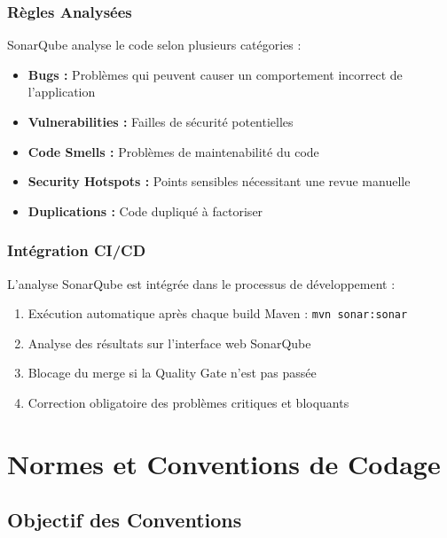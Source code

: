 \documentclass[12pt,a4paper]{report}
\begin{document}
\subsection{Règles Analysées}

SonarQube analyse le code selon plusieurs catégories :

\begin{itemize}
    \item \textbf{Bugs :} Problèmes qui peuvent causer un comportement incorrect de l'application
    \item \textbf{Vulnerabilities :} Failles de sécurité potentielles
    \item \textbf{Code Smells :} Problèmes de maintenabilité du code
    \item \textbf{Security Hotspots :} Points sensibles nécessitant une revue manuelle
    \item \textbf{Duplications :} Code dupliqué à factoriser
\end{itemize}

\subsection{Intégration CI/CD}

L'analyse SonarQube est intégrée dans le processus de développement :

\begin{enumerate}
    \item Exécution automatique après chaque build Maven : \texttt{mvn sonar:sonar}
    \item Analyse des résultats sur l'interface web SonarQube
    \item Blocage du merge si la Quality Gate n'est pas passée
    \item Correction obligatoire des problèmes critiques et bloquants
\end{enumerate}

\newpage

\chapter{Normes et Conventions de Codage}

\section{Objectif des Conventions}
\end{document}
